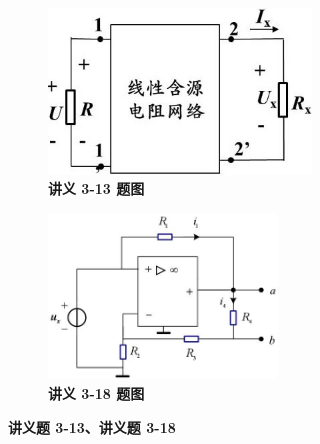 \documentclass[UTF8]{report}
\theoremstyle{MyLineTheoremStyle} %
\theoremstyle{MyBlockTheoremStyle} %
\theoremstyle{MySubsubsectionStyle} %
\begin{document}
\begin{figure}[H]\centering
\begin{subfigure}[t]{0.45\columnwidth}\centering
    \includegraphics[height=125pt]{assets/6/image (9).jpg}
    \caption{\bfseries 讲义 3-13 题图 }
\end{subfigure}\hfill
\begin{subfigure}[t]{0.55\columnwidth}\centering
    \includegraphics[height=125pt]{assets/6/image (10).jpg}
    \caption{\bfseries 讲义 3-18 题图 }
\end{subfigure}
\caption{\bfseries 讲义题 3-13、讲义题 3-18 }
\end{figure}
\end{document}
